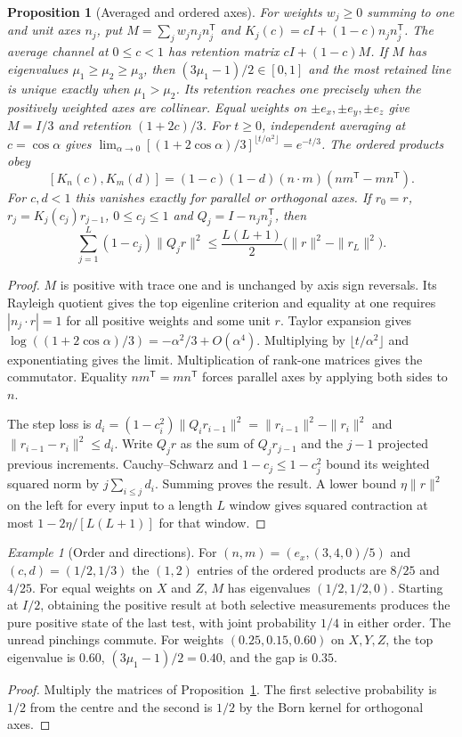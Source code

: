 \documentclass[aps,pra,onecolumn,superscriptaddress,nofootinbib,10pt]{revtex4-2}
\newtheorem{proposition}[theorem]{Proposition}
\theoremstyle{definition}
\theoremstyle{remark}
\newtheorem{example}[theorem]{Example}
\begin{document}
\begin{proposition}[Averaged and ordered axes]\label{ob:axes}
For weights $w_j\ge0$ summing to one and unit axes $n_j$, put
$M=\sum_j w_jn_jn_j^{\mathsf T}$ and $K_j(c)=cI+(1-c)n_jn_j^{\mathsf T}$.
The average channel at $0\le c<1$ has retention matrix $cI+(1-c)M$.
If $M$ has eigenvalues $\mu_1\ge\mu_2\ge\mu_3$, then
$(3\mu_1-1)/2\in[0,1]$ and the most retained line is unique
exactly when $\mu_1>\mu_2$. Its retention reaches one precisely
when the positively weighted axes are collinear. Equal weights on
$\pm e_x,\pm e_y,\pm e_z$ give $M=I/3$ and retention $(1+2c)/3$.
For $t\ge0$, independent averaging at $c=\cos\alpha$ gives
$\lim_{\alpha\to0}[(1+2\cos\alpha)/3]^{\lfloor t/\alpha^2\rfloor}=e^{-t/3}$.
The ordered products obey
\[
 [K_n(c),K_m(d)]=(1-c)(1-d)(n\cdot m)(nm^{\mathsf T}-mn^{\mathsf T}).
\]
For $c,d<1$ this vanishes exactly for parallel or orthogonal axes.
If $r_0=r$, $r_j=K_j(c_j)r_{j-1}$, $0\le c_j\le1$ and
$Q_j=I-n_jn_j^{\mathsf T}$, then
\[
 \sum_{j=1}^{L}(1-c_j)\|Q_jr\|^2
 \le\frac{L(L+1)}2\bigl(\|r\|^2-\|r_L\|^2\bigr).
\]
\end{proposition}
\begin{proof}
$M$ is positive with trace one and is unchanged by axis sign
reversals. Its Rayleigh quotient gives the top eigenline criterion
and equality at one requires $|n_j\cdot r|=1$ for all positive
weights and some unit $r$. Taylor expansion gives
$\log((1+2\cos\alpha)/3)=-\alpha^2/3+O(\alpha^4)$. Multiplying by
$\lfloor t/\alpha^2\rfloor$ and exponentiating gives the limit.
Multiplication of rank-one matrices gives the commutator.
Equality $nm^{\mathsf T}=mn^{\mathsf T}$ forces parallel axes by
applying both sides to $n$.

The step loss is $d_i=(1-c_i^2)\|Q_ir_{i-1}\|^2=
\|r_{i-1}\|^2-\|r_i\|^2$ and $\|r_{i-1}-r_i\|^2\le d_i$.
Write $Q_jr$ as the sum of $Q_jr_{j-1}$ and the $j-1$ projected
previous increments. Cauchy--Schwarz and $1-c_j\le1-c_j^2$ bound its
weighted squared norm by $j\sum_{i\le j}d_i$. Summing proves the result.
A lower bound $\eta\|r\|^2$ on the left for every input to a length
$L$ window gives squared contraction at most $1-2\eta/[L(L+1)]$
for that window.
\end{proof}

\begin{example}[Order and directions]\label{ob:axisexamples}
For $(n,m)=(e_x,(3,4,0)/5)$ and $(c,d)=(1/2,1/3)$ the
$(1,2)$ entries of the ordered products are $8/25$ and $4/25$.
For equal weights on $X$ and $Z$, $M$ has eigenvalues $(1/2,1/2,0)$.
Starting at $I/2$, obtaining the positive result at both selective
measurements produces the pure positive state of the last test,
with joint probability $1/4$ in either order. The unread pinchings
commute. For weights $(0.25,0.15,0.60)$ on $X,Y,Z$, the top
eigenvalue is $0.60$, $(3\mu_1-1)/2=0.40$, and the gap is $0.35$.
\end{example}
\begin{proof}
Multiply the matrices of Proposition~\ref{ob:axes}. The first
selective probability is $1/2$ from the centre and the second is
$1/2$ by the Born kernel for orthogonal axes.
\end{proof}
\end{document}
